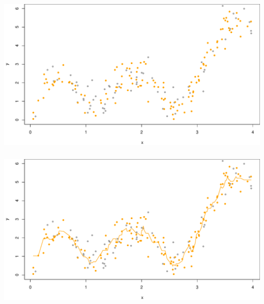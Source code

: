 \documentclass[xetex,mathserif,serif,aspectratio=169]{beamer}
\begin{document}
\begin{frame}[fragile] \frametitle{} \oldB \small

\begin{center}
\includegraphics[width=\textwidth]{img/valid3.pdf}
\end{center}

\end{frame}

\begin{frame}[fragile] \frametitle{} \oldB \small

\begin{center}
\includegraphics[width=\textwidth]{img/valid4.pdf}
\end{center}

\end{frame}
\end{document}
